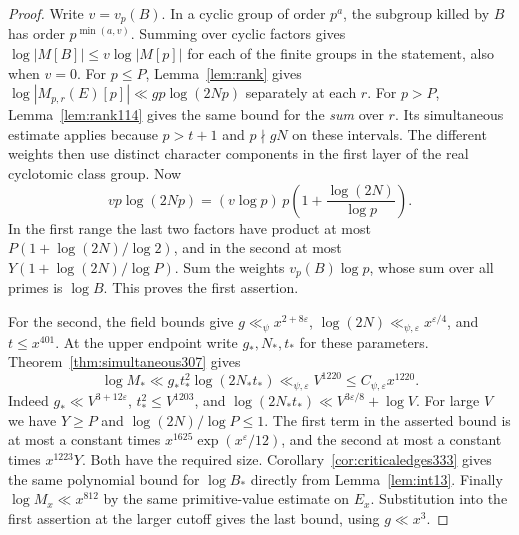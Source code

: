 \documentclass[a4paper,11pt]{article}
\theoremstyle{definition}
\theoremstyle{remark}
\numberwithin{equation}{section}
\begin{document}
\begin{proof}
Write \(v=v_p(B)\). In a cyclic group of order \(p^a\), the subgroup
killed by \(B\) has order \(p^{\min(a,v)}\). Summing over cyclic
factors gives \(\log|M[B]|\le v\log|M[p]|\) for each of the finite
groups in the statement, also when \(v=0\).
For \(p\le P\), Lemma~\ref{lem:rank} gives
\(\log|M_{p,r}(E)[p]|\ll gp\log(2Np)\) separately at each \(r\).
For \(p>P\), Lemma~\ref{lem:rank114} gives the same bound for the
\emph{sum} over \(r\). Its simultaneous estimate applies because
\(p>t+1\) and \(p\nmid gN\) on these intervals. The different weights
then use distinct character components in the first layer of the real
cyclotomic class group. Now
\[
  v p\log(2Np)=(v\log p)\,p\left(1+\frac{\log(2N)}{\log p}\right).
\]
In the first range the last two factors have product at most
\(P(1+\log(2N)/\log 2)\), and in the second at most
\(Y(1+\log(2N)/\log P)\). Sum the weights \(v_p(B)\log p\), whose
sum over all primes is \(\log B\). This proves the first assertion.

For the second, the field bounds give
\(g\ll_\psi x^{2+8\varepsilon}\), \(\log(2N)\ll_{\psi,\varepsilon}
x^{\varepsilon/4}\), and \(t\le x^{401}\). At the upper endpoint
write \(g_*,N_*,t_*\) for these parameters. Theorem~\ref{thm:simultaneous307}
gives
\[
   \log M_* \ll g_*t_*^2\log(2N_*t_*)
       \ll_{\psi,\varepsilon} V^{1220}\le C_{\psi,\varepsilon}x^{1220}.
\]
Indeed \(g_*\ll V^{3+12\varepsilon}\),
\(t_*^2\le V^{1203}\), and \(\log(2N_*t_*)\ll V^{3\varepsilon/8}+\log V\).
For large \(V\) we have \(Y\ge P\) and \(\log(2N)/\log P\le1\).
The first term in the asserted bound is at most a constant times
\(x^{1625}\exp(x^\varepsilon/12)\), and the second at most a
constant times \(x^{1223}Y\). Both have the required size.
Corollary~\ref{cor:criticaledges333} gives the same polynomial bound
for \(\log B_*\) directly from Lemma~\ref{lem:int13}. Finally
\(\log M_x\ll x^{812}\) by the same primitive-value estimate on
\(E_x\). Substitution into the first assertion at the larger cutoff
gives the last bound, using \(g\ll x^3\).
\end{proof}
\end{document}
